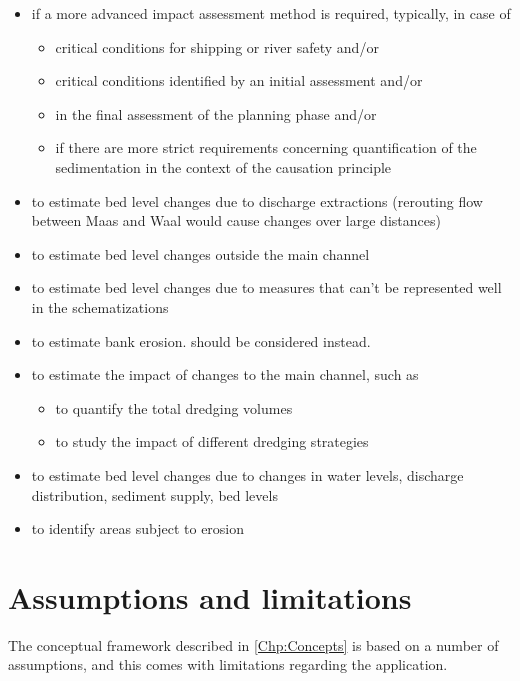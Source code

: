 \begin{itemize}
\item if a more advanced impact assessment method is required, typically, in case of
\begin{itemize}
\item critical conditions for shipping or river safety and/or
\item critical conditions identified by an initial \dfmi assessment and/or
\item in the final assessment of the planning phase and/or
\item if there are more strict requirements concerning quantification of the sedimentation in the context of the causation principle
\end{itemize}
\item to estimate bed level changes due to discharge extractions (rerouting flow between Maas and Waal would cause changes over large distances)
\item to estimate bed level changes outside the main channel
\item to estimate bed level changes due to measures that can't be represented well in the \dflowfm schematizations
\item to estimate bank erosion. \dfastbe should be considered instead.
\item to estimate the impact of changes to the main channel, such as
\begin{itemize}
\item to quantify the total dredging volumes
\item to study the impact of different dredging strategies
\end{itemize}
\item to estimate bed level changes due to changes in water levels, discharge distribution, sediment supply, bed levels
\item to identify areas subject to erosion
\end{itemize}


\section{Assumptions and limitations}\label{Sec:Limitations}

The conceptual framework described in \autoref{Chp:Concepts} is based on a number of assumptions, and this comes with limitations regarding the application.

